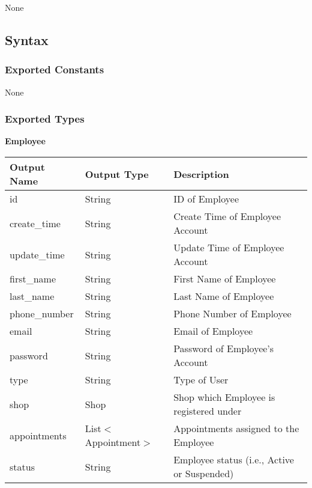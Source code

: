 \documentclass[12pt, titlepage]{article}
\begin{document}
None

\subsection{Syntax}

\subsubsection{Exported Constants}

None

\subsubsection{Exported Types}

\textbf{Employee}

\begin{table}[H]
	\begin{tabular}{|p{}|p{}|p{}|}
		\hline
		\textbf{Output Name} & \textbf{Output Type}  & \textbf{Description}                        \\
		\hline
		id                   & String                & ID of Employee                              \\
		\hline
		create\_time         & String                & Create Time of Employee Account             \\
		\hline
		update\_time         & String                & Update Time of Employee Account             \\
		\hline
		first\_name          & String                & First Name of Employee                      \\
		\hline
		last\_name           & String                & Last Name of Employee                       \\
		\hline
		phone\_number        & String                & Phone Number of Employee                    \\
		\hline
		email                & String                & Email of Employee                           \\
		\hline
		password             & String                & Password of Employee's Account              \\
		\hline
		type                 & String                & Type of User                                \\
		\hline
		shop                 & Shop                  & Shop which Employee is registered under     \\
		\hline
		appointments         & List$<$Appointment$>$ & Appointments assigned to the Employee       \\
		\hline
		status               & String                & Employee status (i.e., Active or Suspended) \\
		\hline
	\end{tabular}
\end{table}
\end{document}
